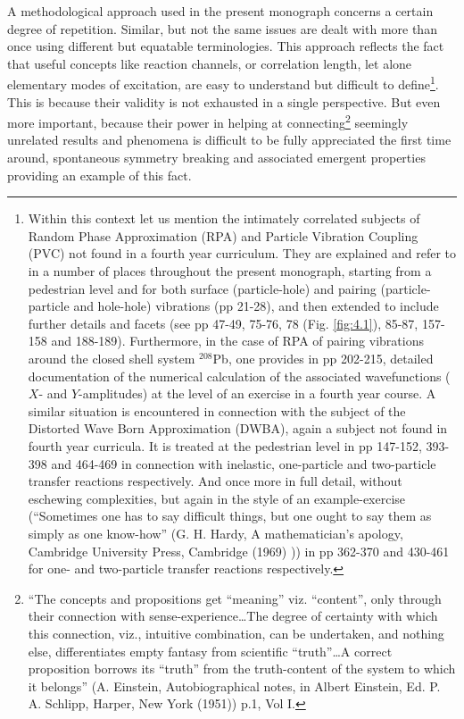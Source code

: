 A methodological approach used in the present monograph concerns a certain degree of repetition. Similar, but not the same issues are dealt with more than once using different but equatable terminologies. This approach reflects the fact that useful concepts like reaction channels, or correlation length, let alone elementary modes of excitation, are easy to understand but difficult to define\footnote{Within this context let us mention the intimately correlated subjects of Random Phase Approximation (RPA) and Particle Vibration Coupling (PVC) not found in a fourth year curriculum. They are explained and refer to in a number of places throughout the present monograph, starting from a pedestrian level and for both surface (particle-hole) and pairing (particle-particle and hole-hole) vibrations (pp 21-28), and then extended to include further details and facets (see pp 47-49, 75-76, 78 (Fig. \ref{fig:4.1}), 85-87, 157-158 and 188-189). Furthermore, in the case of RPA of pairing vibrations around the closed shell system $^{208}$Pb, one provides in pp 202-215, detailed documentation of the numerical calculation of the associated wavefunctions ($X$- and $Y$-amplitudes) at the level of an exercise in a fourth year course. A similar situation is encountered in connection with the subject of the Distorted Wave Born Approximation (DWBA), again a subject not found in fourth year curricula. It is treated at the pedestrian level in pp 147-152, 393-398 and 464-469 in connection with inelastic, one-particle and two-particle transfer reactions respectively. And once more in full detail, without eschewing complexities, but again in the style of an example-exercise (``Sometimes one has to say difficult things, but one ought to say them as simply as one know-how'' (G. H. Hardy, A mathematician's apology, Cambridge University Press, Cambridge (1969) )) in pp 362-370 and 430-461 for one- and two-particle transfer reactions respectively.}. This is because their validity is not exhausted in a single perspective. But even more important, because their power in helping at connecting\footnote{``The concepts and propositions get ``meaning'' viz. ``content'', only through their connection with sense-experience\dots The degree of certainty with which this connection, viz., intuitive combination, can be undertaken, and nothing else, differentiates empty fantasy from scientific ``truth''\dots A correct proposition borrows its ``truth'' from the truth-content of the system to which it belongs'' (A. Einstein, Autobiographical notes, in Albert Einstein, Ed. P. A. Schlipp, Harper, New York (1951)) p.1, Vol I.} seemingly unrelated results and phenomena is difficult to be fully appreciated the first time around, spontaneous symmetry breaking and associated emergent properties providing an example of this fact.

